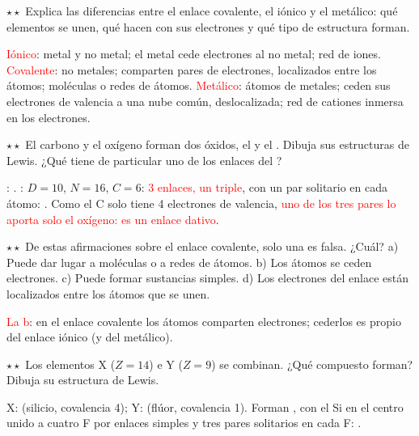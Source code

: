 \begin{exercise}
    \(\star\star\) Explica las diferencias entre el enlace covalente, el iónico y el metálico: qué elementos se unen, qué hacen
    con sus electrones y qué tipo de estructura forman.
    \begin{solu}
        \textcolor{red}{Iónico}: metal y no metal; el metal cede electrones al no metal; red de iones. \textcolor{red}{Covalente}:
        no metales; comparten pares de electrones, localizados entre los átomos; moléculas o redes de átomos.
        \textcolor{red}{Metálico}: átomos de metales; ceden sus electrones de valencia a una nube común, deslocalizada; red de
        cationes inmersa en los electrones.
    \end{solu}
\end{exercise}

\begin{exercise}
    \(\star\star\) El carbono y el oxígeno forman dos óxidos, el  y el . Dibuja sus estructuras de Lewis. ¿Qué
    tiene de particular uno de los enlaces del ?
    \begin{solu}
        : \textcolor{red}{}.
        : \(D = 10\), \(N = 16\), \(C = 6\): \textcolor{red}{3 enlaces, un triple}, con un par solitario en cada átomo:
        \textcolor{red}{}. Como el C solo tiene 4 electrones de valencia,
        \textcolor{red}{uno de los tres pares lo aporta solo el oxígeno: es un enlace dativo}.
    \end{solu}
\end{exercise}

\begin{exercise}
    \(\star\star\) De estas afirmaciones sobre el enlace covalente, solo una es falsa. ¿Cuál? a) Puede dar lugar a moléculas o a
    redes de átomos. b) Los átomos se ceden electrones. c) Puede formar sustancias simples. d) Los electrones del enlace están
    localizados entre los átomos que se unen.
    \begin{solu}
        \textcolor{red}{La b}: en el enlace covalente los átomos comparten electrones; cederlos es propio del enlace iónico (y del
        metálico).
    \end{solu}
\end{exercise}

\begin{exercise}
    \(\star\star\) Los elementos X (\(Z = 14\)) e Y (\(Z = 9\)) se combinan. ¿Qué compuesto forman? Dibuja su estructura de Lewis.
    \begin{solu}
        X:  (silicio, covalencia 4); Y:  (flúor, covalencia 1). Forman
        \textcolor{red}{}, con el Si en el centro unido a cuatro F por enlaces simples y tres pares solitarios en cada F:
        \textcolor{red}{}.
    \end{solu}
\end{exercise}

